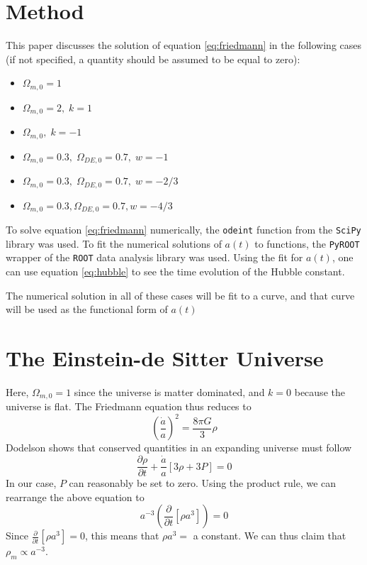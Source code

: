 \documentclass[aps,reprint,prl]{revtex4-1}
\begin{document}
\section*{Method}
This paper discusses the solution of equation \ref{eq:friedmann} in the following cases (if not specified, a quantity should be assumed to be equal to zero):
\begin{itemize}
\item $\Omega_{m,0}=1$
\item $\Omega_{m,0}=2,\;k=1$
\item $\Omega_{m,0},\;k=-1$
\item $\Omega_{m,0}=0.3,\;\Omega_{DE,0}=0.7,\;w=-1$
\item $\Omega_{m,0}=0.3,\;\Omega_{DE,0}=0.7,\;w=-2/3$
\item $\Omega_{m,0}=0.3,\Omega_{DE,0}=0.7,w=-4/3$
\end{itemize}
To solve equation \ref{eq:friedmann} numerically, the \texttt{odeint} function from the \texttt{SciPy} library \cite{scipy} was used.  To fit the numerical solutions of $a(t)$ to functions, the \texttt{PyROOT} wrapper of the \texttt{ROOT} data analysis library \cite{ROOT} was used.  Using the fit for $a(t)$, one can use equation \ref{eq:hubble} to see the time evolution of the Hubble constant.

The numerical solution in all of these cases will be fit to a curve, and that curve will be used as the functional form of $a(t)$
\section*{The Einstein-de Sitter Universe}
Here, $\Omega_{m,0}=1$ since the universe is matter dominated, and $k=0$ because the universe is flat.  The Friedmann equation thus reduces to
\begin{equation}
\left(\frac{\dot{a}}{a}\right)^2=\frac{8\pi G}{3}\rho
\end{equation}
Dodelson shows that conserved quantities in an expanding universe must follow
\begin{equation}
\frac{\partial \rho}{\partial t} + \frac{\dot{a}}{a}\left[3\rho+3P\right]=0
\end{equation}
In our case, $P$ can reasonably be set to zero.  Using the product rule, we can rearrange the above equation to
\begin{equation}
a^{-3}\left(\frac{\partial}{\partial t}\left[\rho a^3\right]\right)=0
\end{equation}
Since $\frac{\partial}{\partial t}\left[\rho a^{3}\right]=0$, this means that $\rho a^{3}=$ a constant.  We can thus claim that $\rho_m \propto a^{-3}$.
\end{document}
